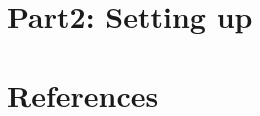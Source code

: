 \documentclass[a4paper,12pt]{article}
\begin{document}
	
	\section{Part2: Setting up}
	
	
	
	
	\section{References}
	
	
	
\end{document}
